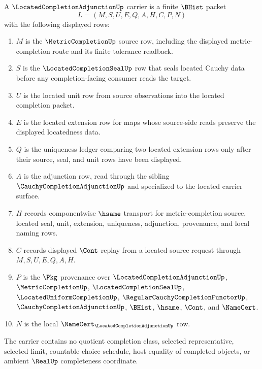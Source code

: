 \begin{definition}
\label{def:located-completion-adjunction-carrier}
A $\LocatedCompletionAdjunctionUp$ carrier is a finite $\BHist$ packet
$$
L=(M,S,U,E,Q,A,H,C,P,N)
$$
with the following displayed rows:
\begin{enumerate}
\item $M$ is the $\MetricCompletionUp$ source row, including the displayed metric-completion route and its finite tolerance readback.
\item $S$ is the $\LocatedCompletionSealUp$ row that seals located Cauchy data before any completion-facing consumer reads the target.
\item $U$ is the located unit row from source observations into the located completion packet.
\item $E$ is the located extension row for maps whose source-side reads preserve the displayed locatedness data.
\item $Q$ is the uniqueness ledger comparing two located extension rows only after their source, seal, and unit rows have been displayed.
\item $A$ is the adjunction row, read through the sibling $\CauchyCompletionAdjunctionUp$ and specialized to the located carrier surface.
\item $H$ records componentwise $\hsame$ transport for metric-completion source, located seal, unit, extension, uniqueness, adjunction, provenance, and local naming rows.
\item $C$ records displayed $\Cont$ replay from a located source request through $M,S,U,E,Q,A,H$.
\item $P$ is the $\Pkg$ provenance over $\LocatedCompletionAdjunctionUp$, $\MetricCompletionUp$, $\LocatedCompletionSealUp$, $\LocatedUniformCompletionUp$, $\RegularCauchyCompletionFunctorUp$, $\CauchyCompletionAdjunctionUp$, $\BHist$, $\hsame$, $\Cont$, and $\NameCert$.
\item $N$ is the local $\NameCert_{\LocatedCompletionAdjunctionUp}$ row.
\end{enumerate}
The carrier contains no quotient completion class, selected representative, selected limit, countable-choice schedule, host equality of completed objects, or ambient $\RealUp$ completeness coordinate.
\end{definition}

